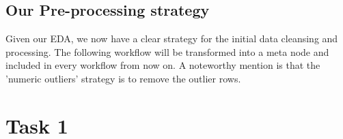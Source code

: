 \documentclass[11pt]{article}
\begin{document}
		\subsection*{Our Pre-processing strategy}
			Given our EDA, we now have a clear strategy for the initial data cleansing and processing. The following workflow will be transformed into a meta node and included in every workflow from now on. A noteworthy mention is that the 'numeric outliers' strategy is to remove the outlier rows.

			

	\section*{Task 1}
\end{document}
